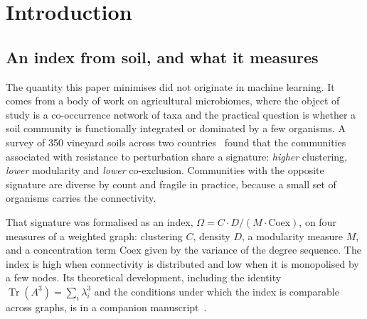 \documentclass[11pt,a4paper]{article}
\begin{document}
\begin{abstract}
\textbf{How much run-to-run variation this setting carries.} Repeating an
identical configuration, same seed and same hardware, gives a standard
deviation of $0.104$ in retention ratio. We report it because we have not found
it quantified for low-rank fine-tuning of language models, and because it bounds
the reading of any seed-paired comparison, including ours.

Two forms of the penalty exist and they are not interchangeable; they rank
oppositely across the two settings above, and we define both explicitly
(Section~\ref{sec:twoforms}). Code, per-run results and the full record of
negative results are at
\url{https://github.com/BiomeMakers/OmegaS-LLM} under AGPL-3.0 for research use.
\end{abstract}

\newpage
\section{Introduction}

\subsection{An index from soil, and what it measures}

The quantity this paper minimises did not originate in machine learning. It
comes from a body of work on agricultural microbiomes, where the object of study
is a co-occurrence network of taxa and the practical question is whether a soil
community is functionally integrated or dominated by a few organisms. A survey
of 350 vineyard soils across two countries~\cite{ortiz2021} found that the
communities associated with resistance to perturbation share a signature:
\emph{higher} clustering, \emph{lower} modularity and \emph{lower}
co-exclusion. Communities with the opposite signature are diverse by count and
fragile in practice, because a small set of organisms carries the connectivity.

That signature was formalised as an index,
$\Omega = C \cdot D / (M \cdot \mathrm{Coex})$, on four measures of a weighted
graph: clustering $C$, density $D$, a modularity measure $M$, and a
concentration term $\mathrm{Coex}$ given by the variance of the degree sequence.
The index is high when connectivity is distributed and low when it is
monopolised by a few nodes. Its theoretical development, including the identity
$\operatorname{Tr}(A^3) = \sum_i \lambda_i^3$ and the conditions under which the
index is comparable across graphs, is in a companion
manuscript~\cite{acedo2026fsri}.
\end{document}
